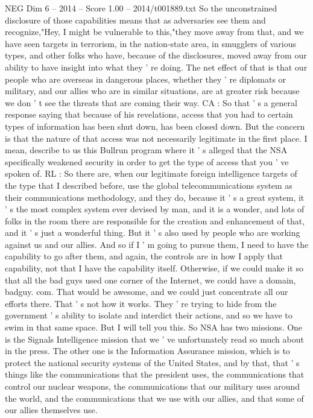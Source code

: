 \begin{textsample}{NEG Dim 6 – 2014 – Score 1.00 – 2014/t001889.txt}
So the unconstrained disclosure of those capabilities means that as adversaries see them and recognize,"Hey, I might be vulnerable to this,"they move away from that, and we have seen targets in terrorism, in the nation-state area, in smugglers of various types, and other folks who have, because of the disclosures, moved away from our ability to have insight into what they ' re doing.
The net effect of that is that our people who are overseas in dangerous places, whether they ' re diplomats or military, and our allies who are in similar situations, are at greater risk because we don ' t see the threats that are coming their way.
CA : So that ' s a general response saying that because of his revelations, access that you had to certain types of information has been shut down, has been closed down.
But the concern is that the nature of that access was not necessarily legitimate in the first place.
I mean, describe to us this Bullrun program where it ' s alleged that the NSA specifically weakened security in order to get the type of access that you ' ve spoken of.
RL : So there are, when our legitimate foreign intelligence targets of the type that I described before, use the global telecommunications system as their communications methodology, and they do, because it ' s a great system, it ' s the most complex system ever devised by man, and it is a wonder, and lots of folks in the room there are responsible for the creation and enhancement of that, and it ' s just a wonderful thing.
But it ' s also used by people who are working against us and our allies.
And so if I ' m going to pursue them, I need to have the capability to go after them, and again, the controls are in how I apply that capability, not that I have the capability itself.
Otherwise, if we could make it so that all the bad guys used one corner of the Internet, we could have a domain, badguy. com.
That would be awesome, and we could just concentrate all our efforts there.
That ' s not how it works.
They ' re trying to hide from the government ' s ability to isolate and interdict their actions, and so we have to swim in that same space.
But I will tell you this.
So NSA has two missions.
One is the Signals Intelligence mission that we ' ve unfortunately read so much about in the press.
The other one is the Information Assurance mission, which is to protect the national security systems of the United States, and by that, that ' s things like the communications that the president uses, the communications that control our nuclear weapons, the communications that our military uses around the world, and the communications that we use with our allies, and that some of our allies themselves use.

\end{textsample}
